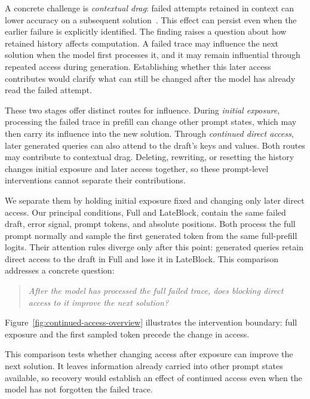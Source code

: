 \documentclass{article}
\newcommand{\fullaccess}{\ifmmode\mathrm{Full}\else\textup{Full}\fi}
\newcommand{\lateblock}{\ifmmode\mathrm{LateBlock}\else\textup{LateBlock}\fi}
\begin{document}
A concrete challenge is \emph{contextual drag}: failed attempts retained in context can lower accuracy on a subsequent solution~\citep{cheng2026contextualdrag}. This effect can persist even when the earlier failure is explicitly identified. The finding raises a question about how retained history affects computation. A failed trace may influence the next solution when the model first processes it, and it may remain influential through repeated access during generation. Establishing whether this later access contributes would clarify what can still be changed after the model has already read the failed attempt.

These two stages offer distinct routes for influence. During \emph{initial exposure}, processing the failed trace in prefill can change other prompt states, which may then carry its influence into the new solution. Through \emph{continued direct access}, later generated queries can also attend to the draft's keys and values. Both routes may contribute to contextual drag. Deleting, rewriting, or resetting the history changes initial exposure and later access together, so these prompt-level interventions cannot separate their contributions.

We separate them by holding initial exposure fixed and changing only later direct access. Our principal conditions, \fullaccess{} and \lateblock{}, contain the same failed draft, error signal, prompt tokens, and absolute positions. Both process the full prompt normally and sample the first generated token from the same full-prefill logits. Their attention rules diverge only after this point: generated queries retain direct access to the draft in \fullaccess{} and lose it in \lateblock{}. This comparison addresses a concrete question:
\begin{quote}
\emph{After the model has processed the full failed trace, does blocking direct access to it improve the next solution?}
\end{quote}

Figure~\ref{fig:continued-access-overview} illustrates the intervention boundary: full exposure and the first sampled token precede the change in access.

This comparison tests whether changing access after exposure can improve the next solution. It leaves information already carried into other prompt states available, so recovery would establish an effect of continued access even when the model has not forgotten the failed trace.
\end{document}
